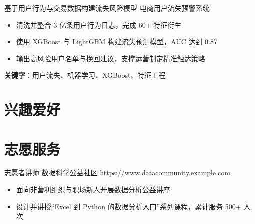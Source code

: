 \documentclass[a4paper, serif, 10pt]{moderncv}
\begin{document}
        {基于用户行为与交易数据构建流失风险模型}
        {电商用户流失预警系统}
        {}
        {}
        {\begin{itemize}
\item 清洗并整合 3 亿条用户行为日志，完成 60+ 特征衍生
\item 使用 XGBoost 与 LightGBM 构建流失预测模型，AUC 达到 0.87
\item 输出高风险用户名单与挽回建议，支撑运营制定精准触达策略
\end{itemize}
\textbf{关键字}：用户流失、机器学习、XGBoost、特征工程}
\section{兴趣爱好}

\section{志愿服务}

        {志愿者讲师}
        {数据科学公益社区}
        {\url{https://www.datacommunity.example.com}}
        {}
        {\begin{itemize}
\item 面向非营利组织与职场新人开展数据分析公益讲座
\item 设计并讲授“Excel 到 Python 的数据分析入门”系列课程，累计服务 500+ 人次
\end{itemize}}
    
\end{document}
